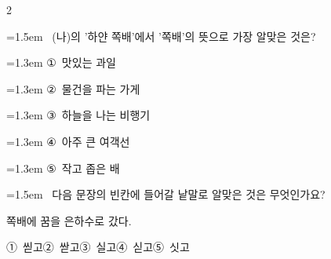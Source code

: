 \documentclass[12pt, a4paper]{article}
\begin{document}
\begin{multicols}{2}
\begin{minipage}{\columnwidth}
\vspace{4mm}
\end{minipage}
\par

\noindent\begin{minipage}{\columnwidth}
\vspace{2mm}
{\hangindent=1.5em  ~(나)의 '하얀 쪽배'에서 '쪽배'의 뜻으로 가장 알맞은 것은?\par}

\vspace{0.5mm}
{\hangindent=1.3em  \noindent\hspace{0.3em}①~맛있는 과일\par}
{\hangindent=1.3em  \noindent\hspace{0.3em}②~물건을 파는 가게\par}
{\hangindent=1.3em  \noindent\hspace{0.3em}③~하늘을 나는 비행기\par}
{\hangindent=1.3em  \noindent\hspace{0.3em}④~아주 큰 여객선\par}
{\hangindent=1.3em  \noindent\hspace{0.3em}⑤~작고 좁은 배\par}
\vspace{4mm}
\end{minipage}
\par

\noindent\begin{minipage}{\columnwidth}
\vspace{2mm}
{\hangindent=1.5em  ~다음 문장의 빈칸에 들어갈 낱말로 알맞은 것은 무엇인가요?\par}

\vspace{1mm}
\begin{boxibox}
쪽배에 꿈을 \underline{\hspace{3cm}} 은하수로 갔다. \\
\end{boxibox}
\vspace{1mm}

\vspace{0.5mm}
\noindent
\mbox{①~씯고}\hspace{1em}\mbox{②~싿고}\hspace{1em}\mbox{③~실고}\hspace{1em}\mbox{④~싣고}\hspace{1em}\mbox{⑤~싯고}


\end{minipage}
\end{multicols}
\end{document}
